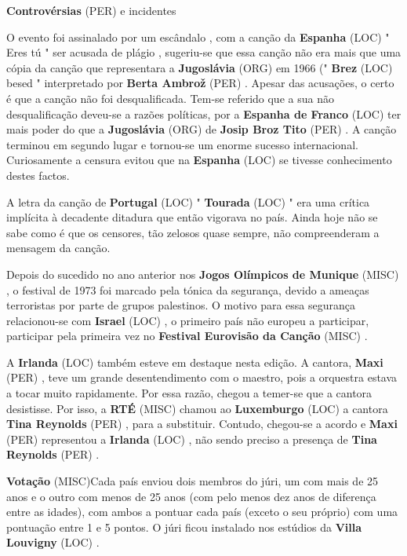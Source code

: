 \documentclass[12pt,a4paper]{article}
\begin{document}
\textbf{Controvérsias} (PER) e incidentes

O evento foi assinalado por um escândalo , com a canção da \textbf{Espanha} (LOC) " Eres tú " ser acusada de plágio , sugeriu-se que essa canção não era mais que uma cópia da canção que representara a \textbf{Jugoslávia} (ORG) em 1966 (" \textbf{Brez} (LOC) besed " interpretado por \textbf{Berta Ambrož} (PER) . Apesar das acusações, o certo é que a canção não foi desqualificada. Tem-se referido que a sua não desqualificação deveu-se a razões políticas, por a \textbf{Espanha de Franco} (LOC) ter mais poder do que a \textbf{Jugoslávia} (ORG) de \textbf{Josip Broz Tito} (PER) . A canção terminou em segundo lugar e tornou-se um enorme sucesso internacional. Curiosamente a censura evitou que na \textbf{Espanha} (LOC) se tivesse conhecimento destes factos.

A letra da canção de \textbf{Portugal} (LOC) " \textbf{Tourada} (LOC) " era uma crítica implícita à decadente ditadura que então vigorava no país. Ainda hoje não se sabe como é que os censores, tão zelosos quase sempre, não compreenderam a mensagem da canção.

Depois do sucedido no ano anterior nos \textbf{Jogos Olímpicos de Munique} (MISC) , o festival de 1973 foi marcado pela tónica da segurança, devido a ameaças terroristas por parte de grupos palestinos. O motivo para essa segurança relacionou-se com \textbf{Israel} (LOC) , o primeiro país não europeu a participar, participar pela primeira vez no \textbf{Festival Eurovisão da Canção} (MISC) .

A \textbf{Irlanda} (LOC) também esteve em destaque nesta edição. A cantora, \textbf{Maxi} (PER) , teve um grande desentendimento com o maestro, pois a orquestra estava a tocar muito rapidamente. Por essa razão, chegou a temer-se que a cantora desistisse. Por isso, a \textbf{RTÉ} (MISC) chamou ao \textbf{Luxemburgo} (LOC) a cantora \textbf{Tina Reynolds} (PER) , para a substituir. Contudo, chegou-se a acordo e \textbf{Maxi} (PER) representou a \textbf{Irlanda} (LOC) , não sendo preciso a presença de \textbf{Tina Reynolds} (PER) .



\textbf{Votação} (MISC)Cada país enviou dois membros do júri, um com mais de 25 anos e o outro com menos de 25 anos (com pelo menos dez anos de diferença entre as idades), com ambos a pontuar cada país (exceto o seu próprio) com uma pontuação entre 1 e 5 pontos. O júri ficou instalado nos estúdios da \textbf{Villa Louvigny} (LOC) .
\end{document}
